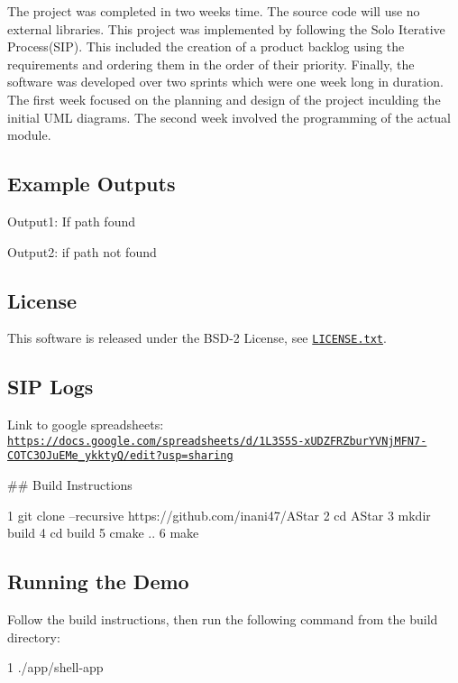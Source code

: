 The project was completed in two weeks time. The source code will use no external libraries. This project was implemented by following the Solo Iterative Process(\+S\+I\+P). This included the creation of a product backlog using the requirements and ordering them in the order of their priority. Finally, the software was developed over two sprints which were one week long in duration. The first week focused on the planning and design of the project inculding the initial U\+ML diagrams. The second week involved the programming of the actual module.

\subsection*{Example Outputs}

Output1\+: If path found



Output2\+: if path not found



\subsection*{License}

This software is released under the B\+S\+D-\/2 License, see \href{LICENSE.txt}{\tt L\+I\+C\+E\+N\+S\+E.\+txt}.

\subsection*{S\+IP Logs}

Link to google spreadsheets\+: \href{https://docs.google.com/spreadsheets/d/1L3S5S-xUDZFRZburYVNjMFN7-COTC3OJuEMe_ykktyQ/edit?usp=sharing}{\tt https\+://docs.\+google.\+com/spreadsheets/d/1\+L3\+S5\+S-\/x\+U\+D\+Z\+F\+R\+Zbur\+Y\+V\+Nj\+M\+F\+N7-\/\+C\+O\+T\+C3\+O\+Ju\+E\+Me\+\_\+ykkty\+Q/edit?usp=sharing}

\#\# Build Instructions 
\begin{DoxyCode}
1 git clone --recursive https://github.com/inani47/AStar
2 cd AStar
3 mkdir build
4 cd build
5 cmake ..
6 make
\end{DoxyCode}
 \subsection*{Running the Demo}

Follow the build instructions, then run the following command from the build directory\+: 
\begin{DoxyCode}
1 ./app/shell-app
\end{DoxyCode}


